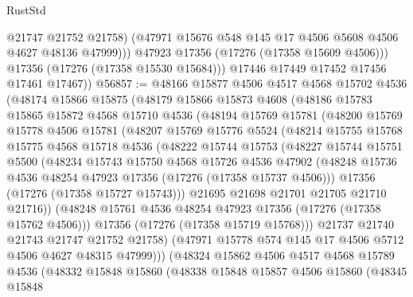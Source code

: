 \begin{lexlean}{RustStd}
\begin{coremodule}
                  @21747
                  @21752
                  @21758)
                (@47971 @15676 @548 @145 @17 @4506 @5608 @4506 @4627 @48136 @47999)))
            @47923
            @17356
            (@17276 (@17358 @15609 @4506)))
          @17356
          (@17276 (@17358 @15530 @15684)))
        @17446
        @17449
        @17452
        @17456
        @17461
        @17467))
@56857 := @48166
    @15877
    @4506
    @4517
    @4568
    @15702
    @4536
    (@48174
      @15866
      @15875
      (@48179
        @15866
        @15873
        @4608
        (@48186
          @15783
          @15865
          @15872
          @4568
          @15710
          @4536
          (@48194
            @15769
            @15781
            (@48200
              @15769
              @15778
              @4506
              @15781
              (@48207
                @15769
                @15776
                @5524
                (@48214
                  @15755
                  @15768
                  @15775
                  @4568
                  @15718
                  @4536
                  (@48222
                    @15744
                    @15753
                    (@48227
                      @15744
                      @15751
                      @5500
                      (@48234
                        @15743
                        @15750
                        @4568
                        @15726
                        @4536
                        @47902
                        (@48248 @15736 @4536 @48254 @47923 @17356 (@17276 (@17358 @15737 @4506)))
                        @17356
                        (@17276 (@17358 @15727 @15743)))
                      @21695
                      @21698
                      @21701
                      @21705
                      @21710
                      @21716))
                  (@48248 @15761 @4536 @48254 @47923 @17356 (@17276 (@17358 @15762 @4506)))
                  @17356
                  (@17276 (@17358 @15719 @15768)))
                @21737
                @21740
                @21743
                @21747
                @21752
                @21758)
              (@47971 @15778 @574 @145 @17 @4506 @5712 @4506 @4627 @48315 @47999)))
          (@48324
            @15862
            @4506
            @4517
            @4568
            @15789
            @4536
            (@48332
              @15848
              @15860
              (@48338
                @15848
                @15857
                @4506
                @15860
                (@48345
                  @15848

\end{coremodule}
\end{lexlean}
